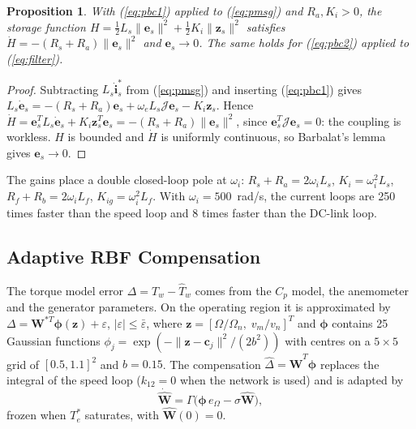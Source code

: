 \documentclass[conference]{IEEEtran}
\newtheorem{proposition}{Proposition}
\newcommand{\bv}[1]{\mathbf{#1}}
\newcommand{\Jm}{\boldsymbol{\mathcal{J}}}
\begin{document}
\begin{proposition}
With (\ref{eq:pbc1}) applied to (\ref{eq:pmsg}) and $R_a,K_i>0$, the storage function
$H=\frac12L_s\|\bv{e}_s\|^2+\frac12K_i\|\bv{z}_s\|^2$ satisfies $\dot H=-(R_s+R_a)\|\bv{e}_s\|^2$ and
$\bv{e}_s\to0$. The same holds for (\ref{eq:pbc2}) applied to (\ref{eq:filter}).
\end{proposition}
\begin{proof}
Subtracting $L_s\dot{\bv{i}}_s^*$ from (\ref{eq:pmsg}) and inserting (\ref{eq:pbc1}) gives
$L_s\dot{\bv{e}}_s=-(R_s+R_a)\bv{e}_s+\omega_eL_s\Jm\bv{e}_s-K_i\bv{z}_s$. Hence
$\dot H=\bv{e}_s^TL_s\dot{\bv{e}}_s+K_i\bv{z}_s^T\bv{e}_s=-(R_s+R_a)\|\bv{e}_s\|^2$, since
$\bv{e}_s^T\Jm\bv{e}_s=0$: the coupling is workless. $H$ is bounded and $\dot H$ is uniformly
continuous, so Barbalat's lemma~\cite{khalil2002} gives $\bv{e}_s\to0$.
\end{proof}
The gains place a double closed-loop pole at $\omega_i$: $R_s+R_a=2\omega_iL_s$, $K_i=\omega_i^2L_s$,
$R_f+R_b=2\omega_iL_f$, $K_{ig}=\omega_i^2L_f$. With $\omega_i=500$~rad/s, the current loops are 250 times
faster than the speed loop and 8 times faster than the DC-link loop.

\subsection{Adaptive RBF Compensation}
The torque model error $\Delta=T_w-\hat T_w$ comes from the $C_p$ model, the anemometer and the
generator parameters. On the operating region it is approximated by
$\Delta=\bv{W}^{*T}\boldsymbol\phi(\bv{z})+\varepsilon$, $|\varepsilon|\le\bar\varepsilon$, where
$\bv{z}=[\Omega/\Omega_n,\;v_m/v_n]^T$ and $\boldsymbol\phi$ contains 25 Gaussian functions
$\phi_j=\exp(-\|\bv{z}-\bv{c}_j\|^2/(2b^2))$ with centres on a $5\times5$ grid of
$[0.5,1.1]^2$ and $b=0.15$. The compensation $\hat\Delta=\hat{\bv{W}}^T\boldsymbol\phi$ replaces the
integral of the speed loop ($k_{12}=0$ when the network is used) and is adapted by
\begin{equation}
\dot{\hat{\bv{W}}} = \Gamma\bigl(\boldsymbol\phi\,e_\Omega - \sigma\hat{\bv{W}}\bigr),
\label{eq:law}
\end{equation}
frozen when $T_e^*$ saturates, with $\hat{\bv{W}}(0)=0$.
\end{document}
